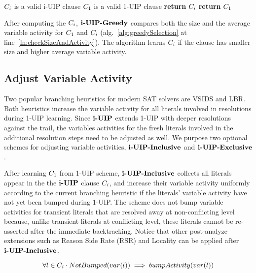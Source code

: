 \begin{algorithm}[t]
\caption{$\IUIPGreedy$}\label{alg:greedySelection}
\begin{algorithmic}[1]
\Require  $C_{i}$ is a valid i-UIP clause
\Require  $C_{1}$ is a valid 1-UIP clause
\Procedure{$\IUIPGreedy$}{$\iUIPClause, \oneUIPClause$} 
    \label{ln:checkSizeAndActivity}
    \State \textbf{return} $C_{i}$
\Else
    \State \textbf{return} $C_{1}$
\EndIf  \label{ln:cSizeCheck}
\EndProcedure
\end{algorithmic}
\end{algorithm}

After computing the $C_{i}$, $\IUIPGreedy$ compares both the size and the average variable activity for $C_{1}$ and $C_{i}$ (alg.~\ref{alg:greedySelection} at line~\ref{ln:checkSizeAndActivity}). The algorithm learns $C_{i}$ if the clause has smaller size and higher average variable activity. 

\subsection{Adjust Variable Activity} \label{sec: varajust}
Two popular branching heuristics for modern SAT solvers are VSIDS and LBR. Both heuristics increase 
the variable activity for all literals involved in resolutions during 1-UIP learning. Since $\textbf{i-UIP}$ extends 1-UIP with deeper resolutions against the trail, the variables activities for the fresh literals involved in the additional resolution steps need to be adjusted as well. We purpose two optional schemes for adjusting variable activities, $\textbf{i-UIP-Inclusive}$ and $\textbf{i-UIP-Exclusive}$. 

After learning $C_{1}$ from 1-UIP scheme, $\textbf{i-UIP-Inclusive}$ collects all literals appear  in the the $\textbf{i-UIP}$ clause $C_{i}$, and increase their variable activity uniformly according to the current branching heuristic if the literals' variable activity have not yet been bumped during 1-UIP. The scheme does not bump variable activities for transient literals that are resolved away at non-conflicting level because, unlike transient literals at conflicting level, these literals cannot be re-asserted after the immediate backtracking. Notice that other post-analyze extensions such as Reason Side Rate (RSR) and Locality\cite{} can be applied after $\textbf{i-UIP-Inclusive}$.

\[ \forall l \in  C_{i} \cdot NotBumped(var(l)) \implies  bumpActivity(var(l)) \]

